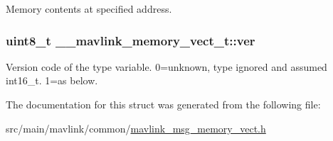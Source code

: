 Memory contents at specified address. 

\hypertarget{struct____mavlink__memory__vect__t_acb180cded1d3dcbf3e719545b50f392e}{
\subsubsection[{ver}]{\setlength{\rightskip}{0pt plus 5cm}uint8\+\_\+t \+\_\+\+\_\+mavlink\+\_\+memory\+\_\+vect\+\_\+t\+::ver}}\label{struct____mavlink__memory__vect__t_acb180cded1d3dcbf3e719545b50f392e}


Version code of the type variable. 0=unknown, type ignored and assumed int16\+\_\+t. 1=as below. 



The documentation for this struct was generated from the following file\+:\begin{DoxyCompactItemize}
\item 
src/main/mavlink/common/\hyperlink{mavlink__msg__memory__vect_8h}{mavlink\+\_\+msg\+\_\+memory\+\_\+vect.\+h}\end{DoxyCompactItemize}
